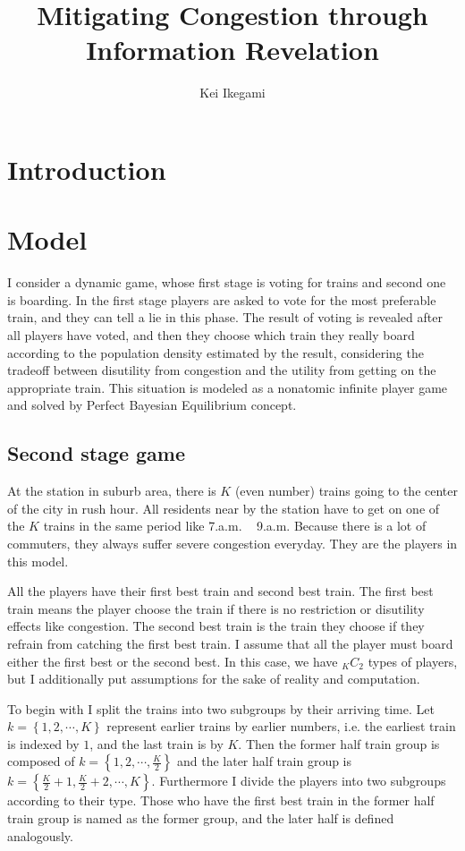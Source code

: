 \documentclass{article}
\begin{document}
\title{Mitigating Congestion through Information Revelation}
\author{Kei Ikegami}
\maketitle

\section{Introduction}

\section{Model}
I consider a dynamic game, whose first stage is voting for trains and second one is boarding. In the first stage players are asked to vote for the most preferable train, and they can tell a lie in this phase. The result of voting is revealed after all players have voted, and then they choose which train they really board according to the population density estimated by the result, considering the tradeoff between disutility from congestion and the utility from getting on the appropriate train. This situation is modeled as a nonatomic infinite player game and solved by Perfect Bayesian Equilibrium concept.

\subsection{Second stage game}
At the station in suburb area, there is $K$ (even number) trains going to the center of the city in rush hour. All residents near by the station have to get on one of the $K$ trains in the same period like 7.a.m. ~ 9.a.m. Because there is a lot of commuters, they always suffer severe congestion everyday. They are the players in this model.

All the players have their first best train and second best train. The first best train means the player choose the train if there is no restriction or disutility effects like congestion. The second best train is the train they choose if they refrain from catching the first best train. I assume that all the player must board either the first best or the second best. In this case, we have ${}_K C _2$ types of players, but I additionally put assumptions for the sake of reality and computation.

To begin with I split the trains into two subgroups by their arriving time. Let $k = \left\{ 1, 2, \cdots, K \right\}$ represent earlier trains by earlier numbers, i.e. the earliest train is indexed by $1$, and the last train is by $K$. Then the former half train group is composed of $k = \left\{ 1,2,\cdots, \frac{K}{2} \right\}$ and the later half train group is $k = \left\{ \frac{K}{2}+1, \frac{K}{2} + 2, \cdots, K \right\}$. Furthermore I divide the players into two subgroups according to their type. Those who have the first best train in the former half train group is named as the former group, and the later half is defined analogously.
\end{document}
